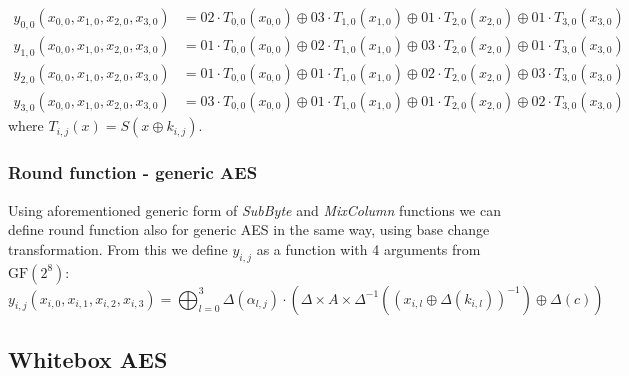 \documentclass[11pt,oneside,final]{fithesis2}
\begin{document}
	{\footnotesize
	\begin{align}
	y_{0,0}\left(x_{0,0}, x_{1,0}, x_{2,0}, x_{3,0}\right) &= 02 \cdot T_{0,0}(x_{0,0}) \oplus 03 \cdot T_{1,0}(x_{1,0})\oplus 01 \cdot T_{2,0}(x_{2,0})\oplus 01 \cdot T_{3,0}(x_{3,0})\\
	y_{1,0}\left(x_{0,0}, x_{1,0}, x_{2,0}, x_{3,0}\right) &= 01 \cdot T_{0,0}(x_{0,0}) \oplus 02 \cdot T_{1,0}(x_{1,0})\oplus 03 \cdot T_{2,0}(x_{2,0})\oplus 01 \cdot T_{3,0}(x_{3,0})\\
	y_{2,0}\left(x_{0,0}, x_{1,0}, x_{2,0}, x_{3,0}\right) &= 01 \cdot T_{0,0}(x_{0,0}) \oplus 01 \cdot T_{1,0}(x_{1,0})\oplus 02 \cdot T_{2,0}(x_{2,0})\oplus 03 \cdot T_{3,0}(x_{3,0})\\
	y_{3,0}\left(x_{0,0}, x_{1,0}, x_{2,0}, x_{3,0}\right) &= 03 \cdot T_{0,0}(x_{0,0}) \oplus 01 \cdot T_{1,0}(x_{1,0})\oplus 01 \cdot T_{2,0}(x_{2,0})\oplus 02 \cdot T_{3,0}(x_{3,0})
	\end{align}}
	where $T_{i,j}(x) = S\left(x \oplus k_{i,j}\right)$.

	\subsubsection*{Round function - generic AES}
	Using aforementioned generic form of \emph{SubByte} and \emph{MixColumn} functions we can define round function also for generic AES in the same way, using base change transformation.
	From this we define $y_{i,j}$ as a function with 4 arguments from $\text{GF}(2^8)$:
	\begin{equation}
	y_{i,j}\left(x_{i,0}, x_{i,1}, x_{i,2}, x_{i,3}\right) = \bigoplus^3_{l=0} \Delta(\alpha_{l,j}) \cdot \left( \Delta \times A \times \Delta^{-1} \left( \left(x_{i,l} \oplus \Delta\left(k_{i,l}\right) \right)^{-1} \right) \oplus \Delta \left(c\right) \right)
	\end{equation}

	\subsection{Whitebox AES}
\end{document}
